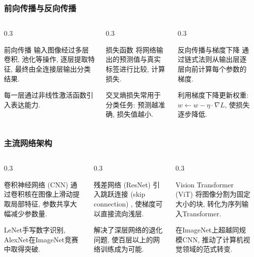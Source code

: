 \documentclass[aspectratio=169]{ctexbeamer}
\begin{document}
\begin{frame}
	\frametitle{前向传播与反向传播}
	\begin{columns}[t]
		\begin{column}{0.3\linewidth}
			\begin{block}{前向传播}
				输入图像经过多层卷积, 池化等操作, 逐层提取特征, 最终由全连接层输出分类结果.

				每一层通过非线性激活函数引入表达能力.
			\end{block}
		\end{column}
		\begin{column}{0.3\linewidth}
			\begin{block}{损失函数}
				将网络输出的预测值与真实标签进行比较, 计算损失.

				交叉熵损失常用于分类任务: 预测越准确, 损失值越小.
			\end{block}
		\end{column}
		\begin{column}{0.3\linewidth}
			\begin{block}{反向传播与梯度下降}
				通过链式法则从输出层逐层向前计算每个参数的梯度.

				利用梯度下降更新权重: $w \leftarrow w - \eta \cdot \nabla L$, 使损失逐步降低.
			\end{block}
		\end{column}
	\end{columns}
\end{frame}

\begin{frame}
	\frametitle{主流网络架构}
	\begin{columns}[t]
		\begin{column}{0.3\linewidth}
			\begin{block}{卷积神经网络 (CNN)}
				通过卷积核在图像上滑动提取局部特征, 参数共享大幅减少参数量.

				LeNet手写数字识别, AlexNet在ImageNet竞赛中取得突破.
			\end{block}
		\end{column}
		\begin{column}{0.3\linewidth}
			\begin{block}{残差网络 (ResNet)}
				引入跳跃连接 (skip connection) , 使梯度可以直接流向浅层.

				解决了深层网络的退化问题, 使百层以上的网络训练成为可能.
			\end{block}
		\end{column}
		\begin{column}{0.3\linewidth}
			\begin{block}{Vision Transformer (ViT)}
				将图像分割为固定大小的块, 转化为序列输入Transformer.

				在ImageNet上超越同规模CNN, 推动了计算机视觉领域的范式转变.
			\end{block}
		\end{column}
	\end{columns}
\end{frame}
\end{document}

